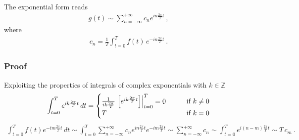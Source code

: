 \documentclass[letterpaper,10pt,english]{jupyterBook}
\begin{document}
\sphinxAtStartPar
The exponential form reads
\begin{equation}\label{equation:ch/complex/fourier-series:eq:fourier-series:exp}
\begin{split}g(t) \sim \sum_{n=-\infty}^{+\infty} c_n e^{i n \frac{2 \pi }{T}t} \ ,\end{split}
\end{equation}
\sphinxAtStartPar
where
\begin{equation}\label{equation:ch/complex/fourier-series:eq:fourier-series:exp:coeff}
\begin{split}c_n = \frac{1}{T} \int_{t=0}^{T} f(t) \, e^{-i n \frac{2\pi}{T} t} \ .\end{split}
\end{equation}\subsubsection*{Proof}

\sphinxAtStartPar
Exploiting the properties of integrals of complex exponentials with \(k \in \mathbb{Z}\)
\begin{equation*}
\begin{split}\int_{t=0}^{T} e^{i k \frac{2 \pi}{T} t} \, dt = 
\begin{cases}
\frac{1}{i k \frac{2 \pi}{T}} \left.\left[ e^{ik \frac{2\pi}{T} t} \right]\right|_{t=0}^{T} = 0 & \hfill \qquad \text{if $ k \ne 0$} \\
T & \hfill \text{if $ k = 0$}
\end{cases}
\end{split}
\end{equation*}\begin{equation*}
\begin{split}\int_{t=0}^{T} f(t) e^{-i m \frac{2 \pi}{T} t} \, dt
 \sim \int_{t=0}^{T} \sum_{n=-\infty}^{+\infty} c_n e^{i n \frac{2 \pi }{T}t}  e^{-i m \frac{2 \pi}{T} t}
 \sim \sum_{n=-\infty}^{+\infty} c_n \sim \int_{t=0}^{T} e^{i (n-m) \frac{2 \pi }{T}t} 
 \sim T \, c_m \ .
\end{split}
\end{equation*}
\sphinxstepscope
\end{document}
